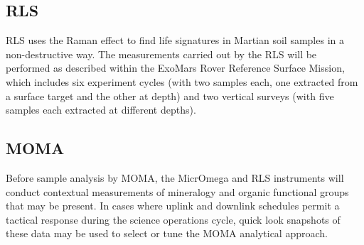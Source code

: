\documentclass[12pt,a4paper]{article}
\begin{document}
\subsection{RLS}
RLS uses the Raman effect to find life signatures in Martian soil samples in a non-destructive way.
The measurements carried out by the RLS will be performed as described within the ExoMars Rover Reference Surface Mission, which includes six experiment cycles (with two samples each, one extracted from a surface target and the other at depth) and two vertical surveys (with five samples each extracted at different depths).
\subsection{MOMA}
Before sample analysis by MOMA, the MicrOmega and RLS instruments will conduct contextual measurements of mineralogy and organic functional groups that may be present. In cases where uplink and downlink schedules permit a tactical response during the science operations cycle, quick look snapshots of these data may be used to select or tune the MOMA analytical approach.


\pagebreak
\nocite{*}


\end{document}
